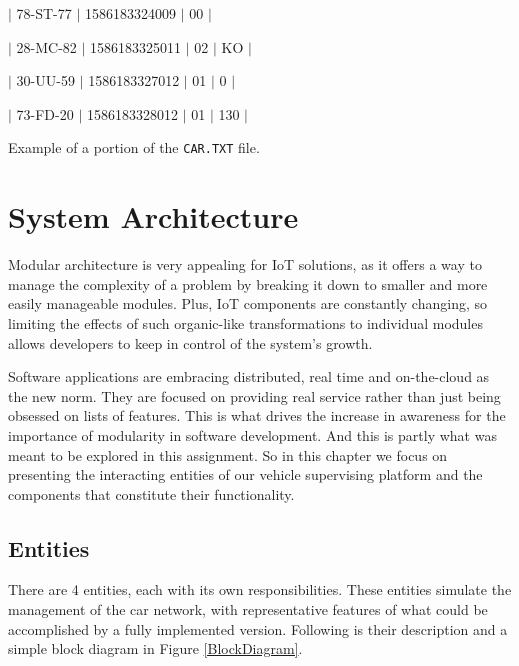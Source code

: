 \documentclass[12pt]{article}
\begin{document}
$|$ 78-ST-77 $|$ 1586183324009 $|$ 00 $|$

$|$ 28-MC-82 $|$ 1586183325011 $|$ 02 $|$ KO $|$

$|$ 30-UU-59 $|$ 1586183327012 $|$ 01 $|$ 0 $|$

$|$ 73-FD-20 $|$ 1586183328012 $|$ 01 $|$ 130 $|$

Example of a portion of the \texttt{CAR.TXT} file.

\newpage 
\section{System Architecture} %

Modular architecture is very appealing for IoT solutions, as it offers a way to manage the complexity of a problem by breaking it down to smaller and more 
easily manageable modules.
Plus, IoT components are constantly changing, so limiting the effects of such organic-like transformations to individual modules allows developers to keep in 
control of the system's growth.

Software applications are embracing distributed, real time and on-the-cloud as the new norm. 
They are focused on providing real service rather than just being obsessed on lists of features.
This is what drives the increase in awareness for the importance of modularity in software development.
And this is partly what was meant to be explored in this assignment.
So in this chapter we focus on presenting the interacting entities of our vehicle supervising platform and the components that constitute their functionality.

\subsection{Entities} \label{entitites} %

There are 4 entities, each with its own responsibilities.
These entities simulate the management of the car network, with representative features of what could be accomplished by a fully implemented version.
Following is their description and a simple block diagram in Figure \ref{BlockDiagram}.
\end{document}
